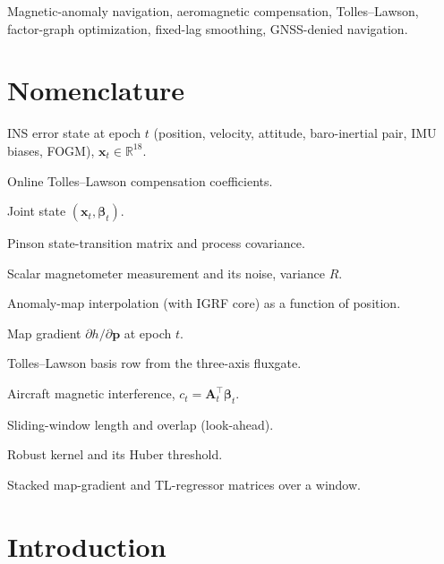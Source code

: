 \documentclass{IEEEtaes}
\begin{document}
\begin{IEEEkeywords}
Magnetic-anomaly navigation, aeromagnetic compensation, Tolles--Lawson,
factor-graph optimization, fixed-lag smoothing, GNSS-denied navigation.
\end{IEEEkeywords}

\section*{Nomenclature}
\begin{IEEEdescription}
\item[$\mathbf{x}_t$] INS error state at epoch $t$ (position, velocity, attitude,
baro-inertial pair, IMU biases, FOGM), $\mathbf{x}_t\in\mathbb{R}^{18}$.
\item[$\boldsymbol{\beta}_t$] Online Tolles--Lawson compensation coefficients.
\item[$\boldsymbol{\chi}_t$] Joint state $(\mathbf{x}_t,\boldsymbol{\beta}_t)$.
\item[$\boldsymbol{\Phi}_t,\mathbf{Q}_t$] Pinson state-transition matrix and process
covariance.
\item[$z_t,\,\eta_t$] Scalar magnetometer measurement and its noise, variance $R$.
\item[$h(\cdot)$] Anomaly-map interpolation (with IGRF core) as a function of
position.
\item[$\mathbf{g}_t$] Map gradient $\partial h/\partial\mathbf{p}$ at epoch $t$.
\item[$\mathbf{A}_t$] Tolles--Lawson basis row from the three-axis fluxgate.
\item[$c_t$] Aircraft magnetic interference, $c_t=\mathbf{A}_t^{\top}\boldsymbol{\beta}_t$.
\item[$L_w,\,L_o$] Sliding-window length and overlap (look-ahead).
\item[$\rho,\,\delta$] Robust kernel and its Huber threshold.
\item[$\mathbf{G},\boldsymbol{\Psi}$] Stacked map-gradient and TL-regressor matrices
over a window.
\end{IEEEdescription}

\section{Introduction}
\end{document}

